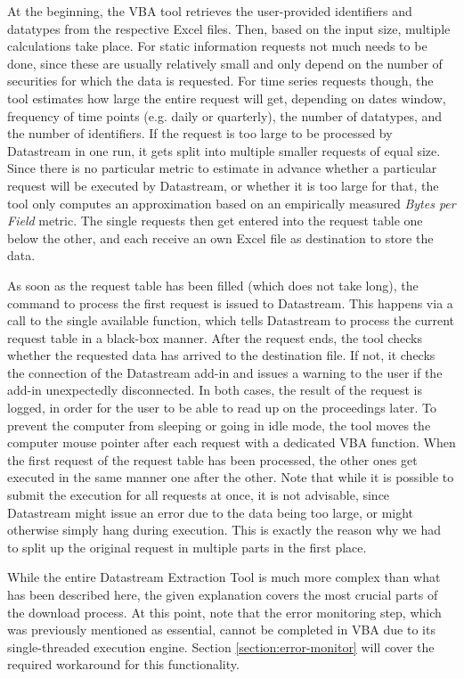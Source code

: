 At the beginning, the VBA tool retrieves the user-provided identifiers and datatypes from the respective Excel files. Then, based on the input size, multiple calculations take place. For static information requests not much needs to be done, since these are usually relatively small and only depend on the number of securities for which the data is requested. For time series requests though, the tool estimates how large the entire request will get, depending on dates window, frequency of time points (e.g. daily or quarterly), the number of datatypes, and the number of identifiers. If the request is too large to be processed by Datastream in one run, it gets split into multiple smaller requests of equal size. Since there is no particular metric to estimate in advance whether a particular request will be executed by Datastream, or whether it is too large for that, the tool only computes an approximation based on an empirically measured \textit{Bytes per Field} metric. The single requests then get entered into the request table one below the other, and each receive an own Excel file as destination to store the data. 

As soon as the request table has been filled (which does not take long), the command to process the first request is issued to Datastream. This happens via a call to the single available function, which tells Datastream to process the current request table in a black-box manner. After the request ends, the tool checks whether the requested data has arrived to the destination file. If not, it checks the connection of the Datastream add-in and issues a warning to the user if the add-in unexpectedly disconnected. In both cases, the result of the request is logged, in order for the user to be able to read up on the proceedings later. To prevent the computer from sleeping or going in idle mode, the tool moves the computer mouse pointer after each request with a dedicated VBA function. When the first request of the request table has been processed, the other ones get executed in the same manner one after the other. Note that while it is possible to submit the execution for all requests at once, it is not advisable, since Datastream might issue an error due to the data being too large, or might otherwise simply hang during execution. This is exactly the reason why we had to split up the original request in multiple parts in the first place. 

While the entire Datastream Extraction Tool is much more complex than what has been described here, the given explanation covers the most crucial parts of the download process. At this point, note that the error monitoring step, which was previously mentioned as essential, cannot be completed in VBA due to its single-threaded execution engine. Section \ref{section:error-monitor} will cover the required workaround for this functionality. 

